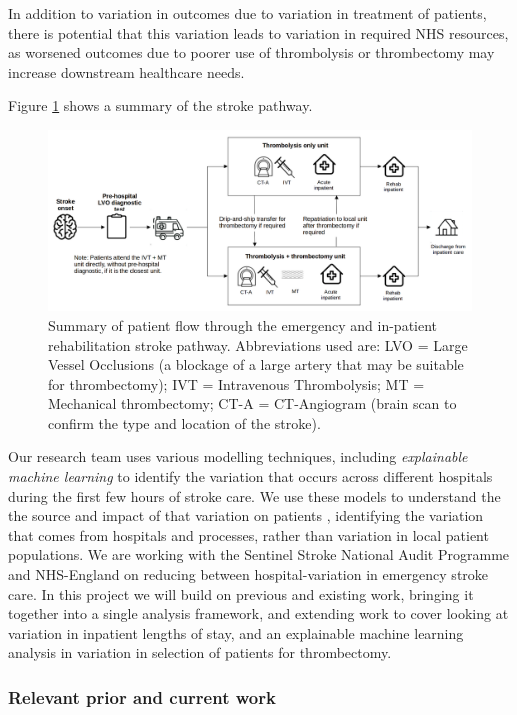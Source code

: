 In addition to variation in outcomes due to variation in treatment of patients, there is potential that this variation leads to variation in required NHS resources, as worsened outcomes due to poorer use of thrombolysis or thrombectomy may increase downstream healthcare needs.

Figure \ref{fig:flow} shows a summary of the stroke pathway. 

\begin{figure}[h!]
\centering
\includegraphics[width=1.0\textwidth]{./images/pathway}
\caption{Summary of patient flow through the emergency and in-patient rehabilitation stroke pathway. Abbreviations used are: LVO = Large Vessel Occlusions (a blockage of a large artery that may be suitable for thrombectomy); IVT = Intravenous Thrombolysis; MT = Mechanical thrombectomy; CT-A = CT-Angiogram (brain scan to confirm the type and location of the stroke).}
\label{fig:flow}
\end{figure}

Our research team uses various modelling techniques, including \textit{explainable machine learning} to identify the variation that occurs across different hospitals during the first few hours of stroke care. We use these models to understand the the source and impact of that variation on patients \cite{allen_using_2022, allen_use_2022}, identifying the variation that comes from hospitals and processes, rather than variation in local patient populations. We are working with the Sentinel Stroke National Audit Programme and NHS-England on reducing between hospital-variation in emergency stroke care. In this project we will build on previous and existing work, bringing it together into a single analysis framework, and extending work to cover looking at variation in inpatient lengths of stay, and an explainable machine learning analysis in variation in selection of patients for thrombectomy.

\subsubsection{Relevant prior and current work}

